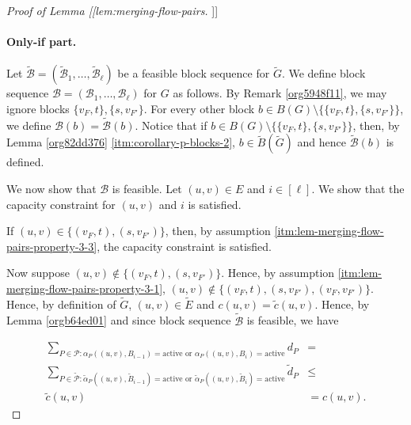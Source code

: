 \documentclass[fontsize=11pt,paper=a4]{book}
\begin{document}
\begin{proof}[Proof of Lemma [[lem:merging-flow-pairs]]]
\paragraph{Only-if part.}
Let \(\tilde{\mathcal{B}}=(\tilde{\mathscr{B}}_1,\dots,\tilde{\mathscr{B}}_{\ell})\) be a feasible block sequence for \(\tilde{G}\).
We define block sequence \(\mathcal{B}=(\mathscr{B}_1,\dots,\mathscr{B}_{\ell})\) for \(G\) as follows.
By Remark \ref{org5948f11}, we may ignore blocks \(\{v_F,t\},\{s,v_{F'}\}\).
For every other block \(b\in B(G)\setminus\{\{v_F,t\},\{s,v_{F'}\}\}\), we define \(\mathcal{B}(b)=\tilde{\mathcal{B}}(b)\).
Notice that if \(b\in B(G)\setminus\{\{v_F,t\},\{s,v_{F'}\}\}\), then, by Lemma \ref{org82dd376} \ref{itm:corollary-p-blocks-2}, \(b\in\tilde{B}(\tilde{G})\) and hence \(\tilde{\mathcal{B}}(b)\) is defined.

We now show that \(\mathcal{B}\) is feasible.
Let \((u,v)\in E\) and \(i\in[\ell]\).
We show that the capacity constraint for \((u,v)\) and \(i\) is satisfied.

If \((u,v)\in\{(v_F,t),(s,v_{F'})\}\), then, by assumption \ref{itm:lem-merging-flow-pairs-property-3-3}, the capacity constraint is satisfied.

Now suppose \((u,v)\notin\{(v_F,t),(s,v_{F'})\}\).
Hence, by assumption \ref{itm:lem-merging-flow-pairs-property-3-1}, \((u,v)\notin\{(v_F,t),(s,v_{F'}),(v_F,v_{F'})\}\).
Hence, by definition of \(\tilde{G}\), \((u,v)\in\tilde{E}\) and \(c(u,v)=\tilde{c}(u,v)\).
Hence, by Lemma \ref{orgb64ed01} and since block sequence \(\tilde{\mathcal{B}}\) is feasible, we have

\begin{align*}
\sum_{P\in\mathcal{P}:\alpha_P((u,v),B_{i-1})=\mathrm{active}\text{ or }\alpha_P((u,v),B_i)=\mathrm{active}}d_P&=\\
\sum_{P\in\tilde{\mathcal{P}}:\tilde{\alpha}_P((u,v),\tilde{B}_{i-1})=\mathrm{active}\text{ or }\tilde{\alpha}_P((u,v),\tilde{B}_i)=\mathrm{active}}\tilde{d}_P&\leq\\
\tilde{c}(u,v)&=
c(u,v).
\end{align*}
\end{proof}
\end{document}
